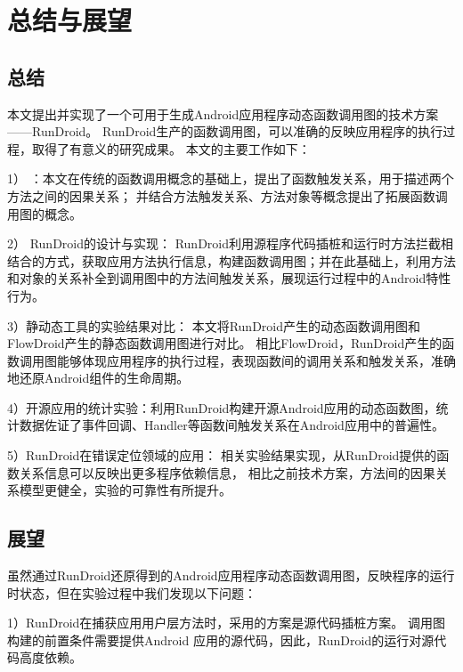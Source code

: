\chapter{总结与展望}
\label{chp:future}
\section{总结}


本文提出并实现了一个可用于生成Android应用程序动态函数调用图的技术方案——RunDroid。
RunDroid生产的函数调用图，可以准确的反映应用程序的执行过程，取得了有意义的研究成果。
本文的主要工作如下：


1） ：本文在传统的函数调用概念的基础上，提出了函数触发关系，用于描述两个方法之间的因果关系；
并结合方法触发关系、方法对象等概念提出了拓展函数调用图的概念。

2） RunDroid的设计与实现：
RunDroid利用源程序代码插桩和运行时方法拦截相结合的方式，获取应用方法执行信息，构建函数调用图；并在此基础上，利用方法和对象的关系补全到调用图中的方法间触发关系，展现运行过程中的Android特性行为。


3）静动态工具的实验结果对比：
本文将RunDroid产生的动态函数调用图和FlowDroid产生的静态函数调用图进行对比。
相比FlowDroid，RunDroid产生的函数调用图能够体现应用程序的执行过程，表现函数间的调用关系和触发关系，准确地还原Android组件的生命周期。

4）开源应用的统计实验：利用RunDroid构建开源Android应用的动态函数图，统计数据佐证了事件回调、Handler等函数间触发关系在Android应用中的普遍性。



5）RunDroid在错误定位领域的应用：
相关实验结果实现，从RunDroid提供的函数关系信息可以反映出更多程序依赖信息，
相比之前技术方案，方法间的因果关系模型更健全，实验的可靠性有所提升。


\section{展望}

虽然通过RunDroid还原得到的Android应用程序动态函数调用图，反映程序的运行时状态，但在实验过程中我们发现以下问题：

1）RunDroid在捕获应用用户层方法时，采用的方案是源代码插桩方案。
调用图构建的前置条件需要提供Android 应用的源代码，因此，RunDroid的运行对源代码高度依赖。

